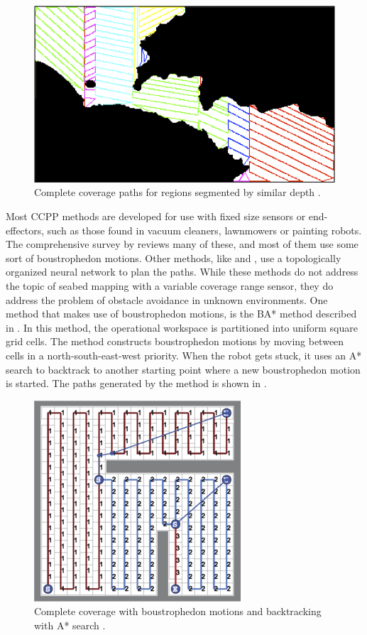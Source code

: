 \begin{figure}[h!]
    \centering
	\includegraphics[width=0.5\linewidth]{fig/lit_rev/galceran_ccpp}
	\caption[Complete coverage paths for regions segmented by similar depth.]{Complete coverage paths for regions segmented by similar depth \citep{galceran2012efficient}.}
	\label{fig:galceran_ccpp}
\end{figure}

Most CCPP methods are developed for use with fixed size sensors or end-effectors, such as those found in vacuum cleaners, lawnmowers or painting robots. The comprehensive survey by \citet{Galceran2013} reviews many of these, and most of them use some sort of boustrophedon motions. Other methods, like \citet{yang2004neural} and \citet{Scibilia2012}, use a topologically organized neural network to plan the paths. While these methods do not address the topic of seabed mapping with a variable coverage range sensor, they do address the problem of obstacle avoidance in unknown environments. One method that makes use of boustrophedon motions, is the BA* method described in \citet{Viet2013}. In this method, the operational workspace is partitioned into uniform square grid cells. The method constructs boustrophedon motions by moving between cells in a north-south-east-west priority. When the robot gets stuck, it uses an A* search to backtrack to another starting point where a new boustrophedon motion is started. The paths generated by the method is shown in . 

\begin{figure}[h!]
    \centering
	\includegraphics[width=0.5\linewidth]{fig/lit_rev/ba_star}
	\caption[Complete coverage with boustrophedon motions and backtracking with A* search.]{Complete coverage with boustrophedon motions and backtracking with A* search \citep{Viet2013}.}
	\label{fig:ba_star}
\end{figure}

